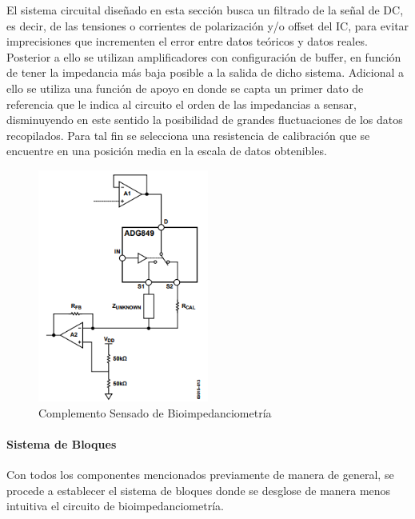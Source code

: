 \documentclass[12pt,letterpaper,spanish]{article}
\begin{document}
				El sistema circuital diseñado en esta sección busca un filtrado de la señal de DC, es decir, de las tensiones o corrientes de polarización y/o offset del IC, para evitar imprecisiones que incrementen el error entre datos teóricos y datos reales. 
Posterior a ello se utilizan amplificadores con configuración de buffer, en función de tener la impedancia más baja posible a la salida de dicho sistema.
Adicional a ello se utiliza una función de apoyo en donde se capta un primer dato de referencia que le indica al circuito el orden de las impedancias a sensar, disminuyendo en este sentido la posibilidad de grandes fluctuaciones de los datos recopilados. Para tal fin se selecciona una resistencia de calibración que se encuentre en una posición media en la escala de datos obtenibles.
			
			\begin{figure}[H]
				\centering
				\includegraphics[width=0.5\textwidth]{./Imagenes/Anexo_Bio.png}
				\caption{Complemento Sensado de Bioimpedanciometría}
			\end{figure}
			
			\paragraph{Sistema de Bloques}
			\hfill\break
			Con todos los componentes mencionados previamente de manera de general, se procede a establecer el sistema de bloques donde se desglose de manera menos intuitiva el circuito de bioimpedanciometría. 
			

				
				
\end{document}
